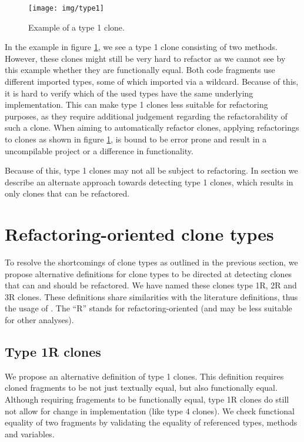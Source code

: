 \begin{figure}[H]
  \texttt{[image: img/type1]}
  \caption{Example of a type 1 clone.}
  \label{fig:type1}
\end{figure}

In the example in figure \ref{fig:type1}, we see a type 1 clone consisting of two methods. However, these clones might still be very hard to refactor as we cannot see by this example whether they are functionally equal. Both code fragments use different imported types, some of which imported via a wildcard. Because of this, it is hard to verify which of the used types have the same underlying implementation. This can make type 1 clones less suitable for refactoring purposes, as they require additional judgement regarding the refactorability of such a clone. When aiming to automatically refactor clones, applying refactorings to clones as shown in figure \ref{fig:type1}, is bound to be error prone and result in a uncompilable project or a difference in functionality.

Because of this, type 1 clones may not all be subject to refactoring. In section \label{chap:type1rclones} we describe an alternate approach towards detecting type 1 clones, which results in only clones that can be refactored.

\section{Refactoring-oriented clone types}
To resolve the shortcomings of clone types as outlined in the previous section, we propose alternative definitions for clone types to be directed at detecting clones that can and should be refactored. We have named these clones type 1R, 2R and 3R clones. These definitions share similarities with the literature definitions, thus the usage of . The ``R'' stands for refactoring-oriented (and may be less suitable for other analyses).

\subsection{Type 1R clones} \label{chap:type1rclones}
We propose an alternative definition of type 1 clones. This definition requires cloned fragments to be not just textually equal, but also functionally equal. Although requiring fragements to be functionally equal, type 1R clones do still not allow for change in implementation (like type 4 clones). We check functional equality of two fragments by validating the equality of referenced types, methods and variables.

